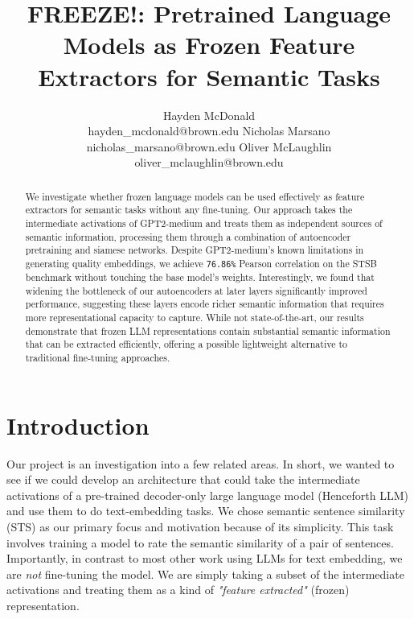 \documentclass{article}
\title{FREEZE!: Pretrained Language Models as Frozen Feature Extractors for Semantic Tasks}
\author{
    Hayden McDonald\\hayden\_mcdonald@brown.edu \And
    Nicholas Marsano\\nicholas\_marsano@brown.edu\And
    Oliver McLaughlin\\oliver\_mclaughlin@brown.edu
}
\begin{document}
\maketitle

\begin{abstract}
    We investigate whether frozen language models can be used effectively as feature extractors for semantic tasks without any fine-tuning. Our approach takes the intermediate activations of GPT2-medium and treats them as independent sources of semantic information, processing them through a combination of autoencoder pretraining and siamese networks. Despite GPT2-medium's known limitations in generating quality embeddings, we achieve \verb|76.86%| Pearson correlation on the STSB benchmark without touching the base model's weights. Interestingly, we found that widening the bottleneck of our autoencoders at later layers significantly improved performance, suggesting these layers encode richer semantic information that requires more representational capacity to capture. While not state-of-the-art, our results demonstrate that frozen LLM representations contain substantial semantic information that can be extracted efficiently, offering a possible lightweight alternative to traditional fine-tuning approaches.
\end{abstract}
\setcounter{tocdepth}{4}

\section{Introduction}
Our project is an investigation into a few related areas. In short, we wanted to see if we could develop an architecture that could take the intermediate activations of a pre-trained decoder-only large language model (Henceforth LLM) and use them to do text-embedding tasks. We chose semantic sentence similarity (STS) as our primary focus and motivation because of its simplicity. This task involves training a model to rate the semantic similarity of a pair of sentences. Importantly, in contrast to most other work using LLMs for text embedding, we are \textit{not} fine-tuning the model. We are simply taking a subset of the intermediate activations and treating them as a kind of \textit{"feature extracted"} (frozen) representation.
\end{document}
